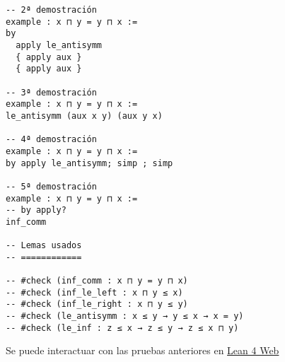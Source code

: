 \begin{verbatim}
-- 2ª demostración
example : x ⊓ y = y ⊓ x :=
by
  apply le_antisymm
  { apply aux }
  { apply aux }

-- 3ª demostración
example : x ⊓ y = y ⊓ x :=
le_antisymm (aux x y) (aux y x)

-- 4ª demostración
example : x ⊓ y = y ⊓ x :=
by apply le_antisymm; simp ; simp

-- 5ª demostración
example : x ⊓ y = y ⊓ x :=
-- by apply?
inf_comm

-- Lemas usados
-- ============

-- #check (inf_comm : x ⊓ y = y ⊓ x)
-- #check (inf_le_left : x ⊓ y ≤ x)
-- #check (inf_le_right : x ⊓ y ≤ y)
-- #check (le_antisymm : x ≤ y → y ≤ x → x = y)
-- #check (le_inf : z ≤ x → z ≤ y → z ≤ x ⊓ y)
\end{verbatim}
Se puede interactuar con las pruebas anteriores en \href{https://lean.math.hhu.de/\#url=https://raw.githubusercontent.com/jaalonso/Calculemus2/main/src/Conmutatividad\_del\_infimo.lean}{Lean 4 Web}

